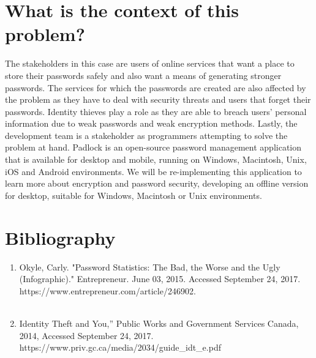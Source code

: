 \documentclass{article}
\begin{document}
\section*{What is the context of this problem?}
The stakeholders in this case are users of online services that want a place to store their passwords safely and also want a means of generating stronger passwords. The services for which the passwords are created are also affected by the problem as they have to deal with security threats and users that forget their passwords. Identity thieves play a role as they are able to breach users’ personal information due to weak passwords and weak encryption methods. Lastly, the development team is a stakeholder as programmers attempting to solve the problem at hand. Padlock is an open-source password management application that is available for desktop and mobile, running on Windows, Macintosh, Unix, iOS and Android environments. We will be re-implementing this application to learn more about encryption and password security, developing an offline version for desktop, suitable for Windows, Macintosh or Unix environments. 

\section*{Bibliography}
\begin{enumerate}
    \item Okyle, Carly. "Password Statistics: The Bad, the Worse and the Ugly (Infographic)." Entrepreneur. June 03, 2015. Accessed September 24, 2017. https://www.entrepreneur.com/article/246902.\\\\
    \item Identity Theft and You,” Public Works and Government Services Canada, 2014, Accessed September 24, 2017. https://www.priv.gc.ca/media/2034/guide\_idt\_e.pdf
\end{enumerate}
\end{document}
